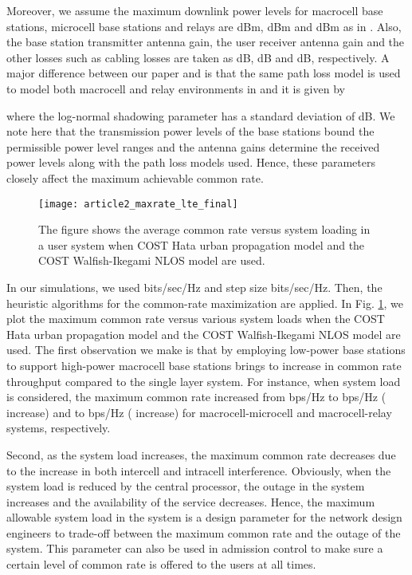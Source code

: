 \documentclass[conference,letterpaper,final,10pt]{IEEEtran}
\begin{document}
Moreover, we assume the maximum downlink power levels for macrocell base stations, microcell base stations and relays are  dBm,  dBm and  dBm as in \cite{ReleaseNine,RamanConf}. Also, the base station transmitter antenna gain, the user receiver antenna gain and the other losses such as cabling losses are taken as  dB,  dB and  dB, respectively. A major difference between our paper and \cite{RamanConf} is that the same path loss model is used to model both macrocell and relay environments in \cite{RamanConf}  and it is given by

where the log-normal shadowing parameter has a standard deviation of  dB. We note here that the transmission power levels of the base stations bound the permissible power level ranges and the antenna gains determine the received power levels along with the path loss models used. Hence, these parameters closely affect the maximum achievable common rate.


\begin{figure}[tb!]\begin{center}
  \texttt{[image: article2\_maxrate\_lte\_final]}\caption{The figure shows the average common rate versus system loading in a  user system when COST  Hata urban propagation model and the COST  Walfish-Ikegami NLOS model are used.}\label{lterate}\end{center}
\end{figure}

In our simulations, we used  bits/sec/Hz and step size  bits/sec/Hz. Then, the heuristic algorithms for the common-rate maximization are applied. In Fig. \ref{lterate}, we plot the maximum common rate versus various system loads when the COST  Hata urban propagation model and the COST  Walfish-Ikegami NLOS model are used. The first observation we make is that by employing low-power base stations to support high-power macrocell base stations brings  to  increase in common rate throughput compared to the single layer system. For instance, when  system load is considered, the maximum common rate increased from  bps/Hz to  bps/Hz ( increase) and to  bps/Hz ( increase) for macrocell-microcell and macrocell-relay systems, respectively.


Second, as the system load increases, the maximum common rate decreases due to the increase in both intercell and intracell interference. Obviously, when the system load is reduced by the central processor, the outage in the system increases and the availability of the service decreases. Hence, the maximum allowable system load in the system is a design parameter for the network design engineers to trade-off between the maximum common rate and the outage of the system. This parameter can also be used in admission control to make sure a certain level of common rate is offered to the users at all times.
\end{document}
